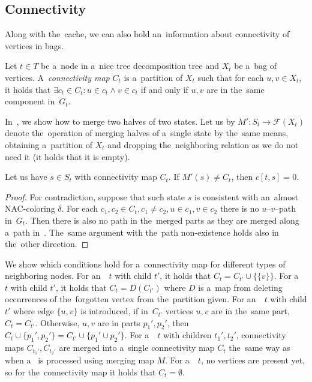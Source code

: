 \subsection{Connectivity}

Along with the~cache, we can also hold an~information about connectivity of
vertices in bags.
%
\begin{definition}
	Let \( t \in T \) be a~node in a~nice tree decomposition tree and
	\( X_t \) be a~bag of vertices.
	A~\emph{connectivity map} \( C_t \) is a~partition of \( X_t \) such that
	for each \( u, v \in X_t \), it holds that
	\( \exists c_t \in C_t : u \in c_t \land v \in c_t \) if and only if
	\( u, v \) are in the~same component in~\( G_t \).
\end{definition}
%

In~, we show how to merge
two halves of two states. Let us by \( M': S_t \to \mathcal{F}(X_t) \) denote
the~operation of merging halves of a~single state by the~same means,
obtaining a~partition of \( X_t \) and dropping
the~neighboring relation as we do not need it
(it holds that it is empty).
%
\begin{lemma}
	Let us have \( s \in S_t \) with connectivity map \( C_t \).
	If \( M'(s) \ne C_t \), then \( c[t, s] = 0 \).
\end{lemma}
%
\begin{proof}
	For contradiction, suppose that such state \( s \)
	is consistent with an~almost NAC-coloring \( \delta \).
	For each \( c_1, c_2 \in C_t, c_1 \ne c_2, u \in c_1, v \in c_2 \)
	there is no \( u \)--\( v \)--path in~\( G_t \).
	Then there is also no path in the~merged parts as
	they are merged along a~path in~.
	The~same argument with the~path non-existence
	holds also in the~other direction.
\end{proof}
%
We show which conditions hold for a~connectivity map
for different types of neighboring nodes.
%
For an~\IntroduceVertexNode{}~\( t \) with child \( t' \), it holds that
\( C_t = C_{t'} \cup \{\{ v \}\} \).
%
For a~\ForgetVertexNode{}~\( t \) with child \( t' \), it holds that
\( C_t = D(C_{t'}) \)
where \( D \) is a~map from 
deleting occurrences of the~forgotten vertex from the~partition given.
%
For an~\IntroduceEdgeNode{}~\( t \) with child \( t' \)
where edge \( \{u, v\} \) is introduced,
if in~\( C_{t'} \) vertices \( u, v \) are in the~same part, \( C_t = C_{t'} \).
Otherwise, \( u, v \) are in parts \( p_1', p_2' \), then
\( C_t \cup \{p_1', p_2'\} = C_{t'} \cup \{ p_1' \cup p_2'\} \).
%
For a~\JoinNode{}~\( t \) with children \( t_1', t_2' \),
connectivity maps \( C_{t_1'}, C_{t_2'} \) are merged into
a~single connectivity map \( C_t \)
the~same way as when a~\JoinNode{} is processed using merging map \( M \).
%
For a~\LeafNode{}~\( t \),
no vertices are present yet, so for the~connectivity map it holds that \( C_t = \emptyset \).


